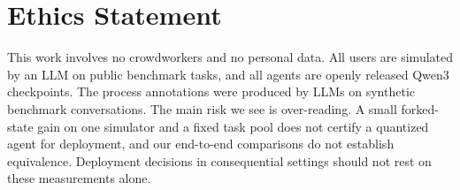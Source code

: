 \section*{Ethics Statement}

This work involves no crowdworkers and no personal data. All users are simulated by an LLM on public benchmark tasks, and all agents are openly released Qwen3 checkpoints. The process annotations were produced by LLMs on synthetic benchmark conversations. The main risk we see is over-reading. A small forked-state gain on one simulator and a fixed task pool does not certify a quantized agent for deployment, and our end-to-end comparisons do not establish equivalence. Deployment decisions in consequential settings should not rest on these measurements alone.

